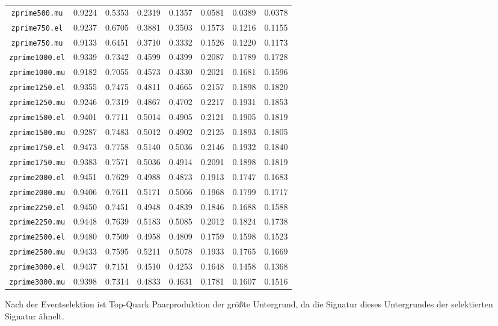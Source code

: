 \begin{table}
{\begin{tabular}{c|ccccccc}
    \texttt{zprime500.mu}  & 0.9224 & 0.5353  & 0.2319 & 0.1357  & 0.0581      & 0.0389         & 0.0378 \\
    \texttt{zprime750.el}  & 0.9237 & 0.6705  & 0.3881 & 0.3503  & 0.1573      & 0.1216         & 0.1155 \\
    \texttt{zprime750.mu}  & 0.9133 & 0.6451  & 0.3710 & 0.3332  & 0.1526      & 0.1220         & 0.1173 \\
    \texttt{zprime1000.el} & 0.9339 & 0.7342  & 0.4599 & 0.4399  & 0.2087      & 0.1789         & 0.1728 \\
    \texttt{zprime1000.mu} & 0.9182 & 0.7055  & 0.4573 & 0.4330  & 0.2021      & 0.1681         & 0.1596 \\
    \texttt{zprime1250.el} & 0.9355 & 0.7475  & 0.4811 & 0.4665  & 0.2157      & 0.1898         & 0.1820 \\
    \texttt{zprime1250.mu} & 0.9246 & 0.7319  & 0.4867 & 0.4702  & 0.2217      & 0.1931         & 0.1853 \\
    \texttt{zprime1500.el} & 0.9401 & 0.7711  & 0.5014 & 0.4905  & 0.2121      & 0.1905         & 0.1819 \\
    \texttt{zprime1500.mu} & 0.9287 & 0.7483  & 0.5012 & 0.4902  & 0.2125      & 0.1893         & 0.1805 \\
    \texttt{zprime1750.el} & 0.9473 & 0.7758  & 0.5140 & 0.5036  & 0.2146      & 0.1932         & 0.1840 \\
    \texttt{zprime1750.mu} & 0.9383 & 0.7571  & 0.5036 & 0.4914  & 0.2091      & 0.1898         & 0.1819 \\
    \texttt{zprime2000.el} & 0.9451 & 0.7629  & 0.4988 & 0.4873  & 0.1913      & 0.1747         & 0.1683 \\
    \texttt{zprime2000.mu} & 0.9406 & 0.7611  & 0.5171 & 0.5066  & 0.1968      & 0.1799         & 0.1717 \\
    \texttt{zprime2250.el} & 0.9450 & 0.7451  & 0.4948 & 0.4839  & 0.1846      & 0.1688         & 0.1588 \\
    \texttt{zprime2250.mu} & 0.9448 & 0.7639  & 0.5183 & 0.5085  & 0.2012      & 0.1824         & 0.1738 \\
    \texttt{zprime2500.el} & 0.9480 & 0.7509  & 0.4958 & 0.4809  & 0.1759      & 0.1598         & 0.1523 \\
    \texttt{zprime2500.mu} & 0.9433 & 0.7595  & 0.5211 & 0.5078  & 0.1933      & 0.1765         & 0.1669 \\
    \texttt{zprime3000.el} & 0.9437 & 0.7151  & 0.4510 & 0.4253  & 0.1648      & 0.1458         & 0.1368 \\
    \texttt{zprime3000.mu} & 0.9398 & 0.7314  & 0.4833 & 0.4631  & 0.1781      & 0.1607         & 0.1516 \\
    \bottomrule 
    \end{tabular}}
\end{table}

Nach der Eventselektion ist Top-Quark Paarproduktion der größte Untergrund, da die Signatur dieses 
Untergrundes der selektierten Signatur ähnelt.